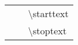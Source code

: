 \begin{longtable}{>{\footnotesize}p{15mm}>{\footnotesize}p{15mm}>{\footnotesize}p{95mm}}
\toprule
  &   & \textbackslash starttext \\
  &   & \textbackslash stoptext \\
\bottomrule
\end{longtable}
